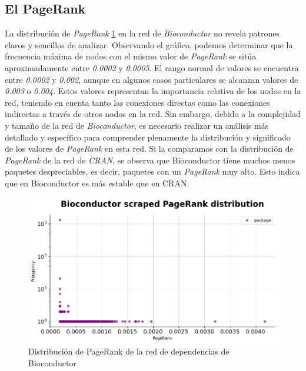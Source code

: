 \subsection{El PageRank}

La distribución de \textit{PageRank} \ref{fig:bioconductor_pagerank_dist} en la red de \textit{Bioconductor} no revela patrones claros
y sencillos de analizar. Observando el gráfico, podemos determinar que la frecuencia máxima de nodos
con el mismo valor de \textit{PageRank} se sitúa aproximadamente entre \textit{0.0002} y \textit{0.0005}.
El rango normal de valores se encuentra entre \textit{0.0002} y \textit{0.002}, aunque en algunos casos
particulares se alcanzan valores de \textit{0.003} o \textit{0.004}. Estos valores representan la importancia
relativa de los nodos en la red, teniendo en cuenta tanto las conexiones directas como las conexiones
indirectas a través de otros nodos en la red. Sin embargo, debido a la complejidad y tamaño de la red
de \textit{Bioconductor}, es necesario realizar un análisis más detallado y específico para comprender
plenamente la distribución y significado de los valores de \textit{PageRank} en esta red.
Si la comparamos con la distribución de \textit{PageRank} de la red de \textit{CRAN}, se observa que
Bioconductor tiene muchos menos paquetes despreciables, es decir, paquetes con un \textit{PageRank} muy
alto. Esto indica que en Bioconductor es más estable que en CRAN.

\begin{figure}[ht!]
    \begin{center}
        \includegraphics[width=1\textwidth]{img/bioconductor/pagerank_dist.png}
        \caption{Distribución de PageRank de la red de dependencias de Bioconductor}
        \label{fig:bioconductor_pagerank_dist}
    \end{center}
\end{figure}


